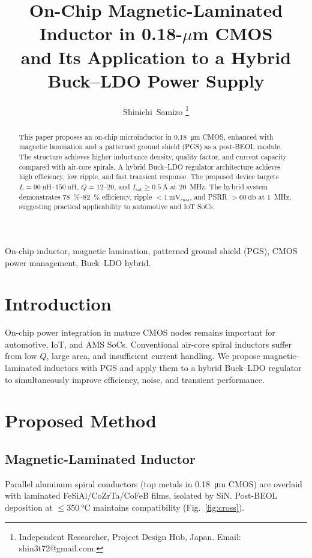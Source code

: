 \documentclass[journal]{IEEEtran}
\title{On-Chip Magnetic-Laminated Inductor in 0.18-\(\mu\)m CMOS \\ and Its Application to a Hybrid Buck--LDO Power Supply}
\author{Shinichi~Samizo%
\thanks{Independent Researcher, Project Design Hub, Japan. Email: shin3t72@gmail.com.}
}
\begin{document}
\maketitle

\begin{abstract}
This paper proposes an on-chip microinductor in \SI{0.18}{\micro\meter} CMOS, enhanced with magnetic lamination and a patterned ground shield (PGS) as a post-BEOL module. The structure achieves higher inductance density, quality factor, and current capacity compared with air-core spirals. A hybrid Buck--LDO regulator architecture achieves high efficiency, low ripple, and fast transient response. The proposed device targets \(L=\SIrange{90}{150}{\nano\henry}\), \(Q=\numrange{12}{20}\), and \(I_{\mathrm{sat}}\ge \SI{0.5}{\ampere}\) at \SI{20}{\mega\hertz}. The hybrid system demonstrates \SIrange{78}{82}{\percent} efficiency, ripple $<\SI{1}{\milli\volt_{rms}}$, and PSRR $>\SI{60}{\decibel}$ at \SI{1}{\mega\hertz}, suggesting practical applicability to automotive and IoT SoCs.
\end{abstract}

\begin{IEEEkeywords}
On-chip inductor, magnetic lamination, patterned ground shield (PGS), CMOS power management, Buck--LDO hybrid.
\end{IEEEkeywords}

\section{Introduction}
On-chip power integration in mature CMOS nodes remains important for automotive, IoT, and AMS SoCs. Conventional air-core spiral inductors suffer from low \(Q\), large area, and insufficient current handling. We propose magnetic-laminated inductors with PGS and apply them to a hybrid Buck--LDO regulator to simultaneously improve efficiency, noise, and transient performance.

\section{Proposed Method}
\subsection{Magnetic-Laminated Inductor}
Parallel aluminum spiral conductors (top metals in \SI{0.18}{\micro\meter} CMOS) are overlaid with laminated FeSiAl/CoZrTa/CoFeB films, isolated by SiN. Post-BEOL deposition at \(\le \SI{350}{\celsius}\) maintains compatibility (Fig.~\ref{fig:cross}).
\end{document}
